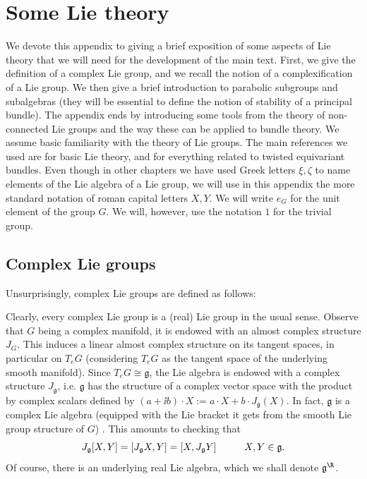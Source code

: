 \chapter{Some Lie theory} \label{appendix_lie}
We devote this appendix to giving a brief exposition of some aspects of Lie theory that we will need for the development of the main text. First, we give the definition of a complex Lie group, and we recall the notion of a complexification of a Lie group. We then give a brief introduction to parabolic subgroups and subalgebras (they will be essential to define the notion of stability of a principal bundle). The appendix ends by introducing some tools from the theory of non-connected Lie groups and the way these can be applied to bundle theory. We assume basic familiarity with the theory of Lie groups. The main references we used are \parencite{hilgert2011structure} for basic Lie theory, and \parencite{barajas2023non} for everything related to twisted equivariant bundles. Even though in other chapters we have used Greek letters \(\xi, \zeta\) to name elements of the Lie algebra of a Lie group, we will use in this appendix the more standard notation of roman capital letters \(X, Y\). We will write \(e_G\) for the unit element of the group \(G\). We will, however, use the notation \(1\) for the trivial group.

\section{Complex Lie groups} \label{section_complex_lie_group}
Unsurprisingly, complex Lie groups are defined as follows:

Clearly, every complex Lie group is a (real) Lie group in the usual sense. Observe that \(G\) being a complex manifold, it is endowed with an almost complex structure \(J_G\). This induces a linear almost complex structure on its tangent spaces, in particular on \(T_eG\) (considering \(T_eG\) as the tangent space of the underlying smooth manifold). Since \(T_eG \cong \mathfrak{g}\), the Lie algebra is endowed with a complex structure \(J_\mathfrak{g}\), i.e. \(\mathfrak{g}\) has the structure of a complex vector space with the product by complex scalars defined by \((a+\ii b)\cdot X:=a\cdot X+ b \cdot J_\mathfrak{g}(X)\). In fact, \(\mathfrak{g}\) is a complex Lie algebra (equipped with the Lie bracket it gets from the smooth Lie group structure of \(G\)) \parencite[Page 55]{knapp2013lie}. This amounts to checking that 
\begin{equation} \label{eq_comp_lie_algebra}
J_\mathfrak{g}[X,Y]=[J_{\mathfrak{g}}X, Y]=[X,J_\mathfrak{g}Y] \hspace{1 cm} X,Y \in \mathfrak{g}.
\end{equation}
Of course, there is an underlying real Lie algebra, which we shall denote \(\mathfrak{g}^\R\). 

